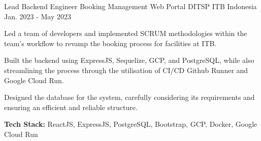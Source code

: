 

\begin{cventries}

  \cventry
    {Lead Backend Engineer} %
    {Booking Management Web Portal DITSP ITB} %
    {Indonesia} %
    {Jan. 2023 - May 2023} %
    {
      \begin{cvitems} %
        \item {Led a team of developers and implemented SCRUM methodologies within the team's workflow to revamp the booking process for facilities at ITB.}
        \item {Built the backend using ExpressJS, Sequelize, GCP, and PostgreSQL, while also streamlining the process through the utilisation of CI/CD Github Runner and Google Cloud Run.}
        \item {Designed the database for the system, carefully considering its requirements and ensuring an efficient and reliable structure.}
        \item {\textbf{Tech Stack:} ReactJS, ExpressJS, PostgreSQL, Bootstrap, GCP, Docker, Google Cloud Run}
      \end{cvitems}
    }

\end{cventries}